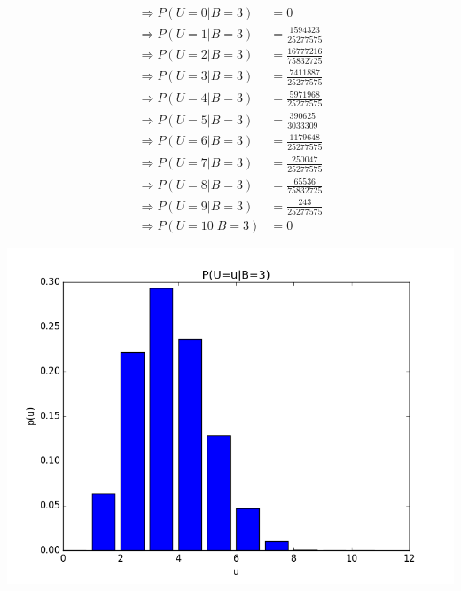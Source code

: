 \begin{align*}
\Rightarrow P(U=0|B=3) &= 0 \\
\Rightarrow P(U=1|B=3) &= \frac{1594323}{25277575} \\
\Rightarrow P(U=2|B=3) &= \frac{16777216}{75832725} \\
\Rightarrow P(U=3|B=3) &= \frac{7411887}{25277575} \\
\Rightarrow P(U=4|B=3) &= \frac{5971968}{25277575} \\
\Rightarrow P(U=5|B=3) &= \frac{390625}{3033309} \\
\Rightarrow P(U=6|B=3) &= \frac{1179648}{25277575} \\
\Rightarrow P(U=7|B=3) &= \frac{250047}{25277575} \\
\Rightarrow P(U=8|B=3) &= \frac{65536}{75832725} \\
\Rightarrow P(U=9|B=3) &= \frac{243}{25277575} \\
\Rightarrow P(U=10|B=3) &= 0
\end{align*}

\includegraphics[scale=0.5]{problems/prob3_plot.png}

